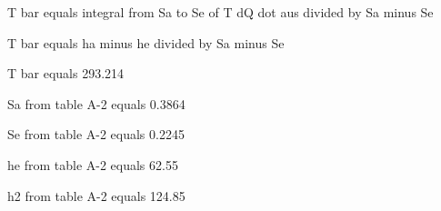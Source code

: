 T bar equals integral from Sa to Se of T dQ dot aus divided by Sa minus Se

T bar equals ha minus he divided by Sa minus Se

T bar equals 293.214

Sa from table A-2 equals 0.3864

Se from table A-2 equals 0.2245

he from table A-2 equals 62.55

h2 from table A-2 equals 124.85